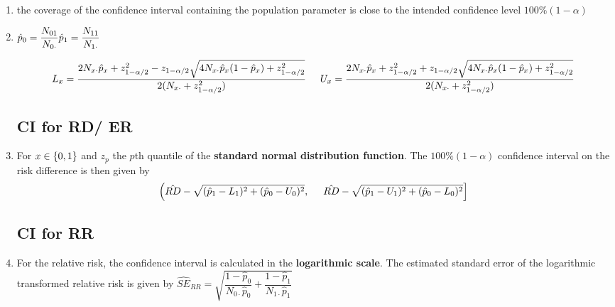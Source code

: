 \begin{enumerate}[itemsep=0.2cm]
    \item the coverage of the confidence interval containing the population parameter is close to the intended confidence level $100\%(1 - \alpha)$

    \item 
    $
        \hfill
        \hat{p}_0 = \dfrac{N_{01}}{N_{0\cdot}}
        \hfill
        \hat{p}_1 = \dfrac{N_{11}}{N_{1\cdot}}
        \hfill
    $

    \[
        \hfill
        L_{x}
        = \dfrac{
            2N_{x\cdot} \hat{p}_x + z^2_{1 - \alpha/2} 
            - z_{1 - \alpha/2} \sqrt{4N_{x\cdot} \hat{p}_x (1- \hat{p}_x) + z^2_{1 - \alpha/2}}
        }{
            2(N_{x\cdot} + z^2_{1 - \alpha/2} )
        }
        \hspace{0.5cm}
        U_{x}
        = \dfrac{
            2N_{x\cdot} \hat{p}_x + z^2_{1 - \alpha/2} 
            + z_{1 - \alpha/2} \sqrt{4N_{x\cdot} \hat{p}_x (1- \hat{p}_x) + z^2_{1 - \alpha/2}}
        }{
            2(N_{x\cdot} + z^2_{1 - \alpha/2} )
        }
        \hfill
    \]

    \subsection*{CI for RD/ ER \cite{ism-1}}

    \item For $x \in \left\{0, 1\right\}$ and $z_p$ the $p$th quantile of the \textbf{standard normal distribution function}. The $100\%(1 - \alpha)$ confidence interval on the risk difference is then given by
    \[
        \hfill
        \left(
            \hat{RD} - \sqrt{(\hat{p}_1 - L_1)^2 + (\hat{p}_0 - U_0)^2},
            \hspace{0.5cm}
            \hat{RD} - \sqrt{(\hat{p}_1 - U_1)^2 + (\hat{p}_0 - L_0)^2}
        \right]
        \hfill
    \]

    \subsection*{CI for RR \cite{ism-1}}

    \item For the relative risk, the confidence interval is calculated in the \textbf{logarithmic scale}. The estimated standard error of the logarithmic transformed relative risk is given by
    $
        \hat{SE}_{RR}
        = \sqrt{
            \dfrac{1 - \hat{p}_0}{N_{0\cdot}\hat{p}_0}
            + \dfrac{1 - \hat{p}_1}{N_{1\cdot}\hat{p}_1}
        }
    $


\end{enumerate}
